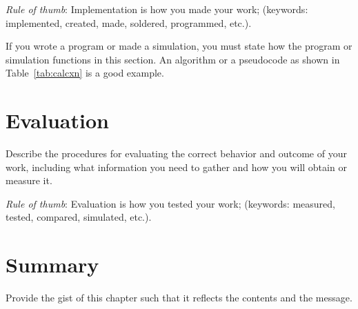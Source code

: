 \noindent \textit{Rule of thumb}: Implementation is how you made your  work; (keywords: implemented, created, made, soldered, programmed, etc.).

If you wrote a program or made a simulation, you must state how the program or simulation functions in this section.	An algorithm or a pseudocode as shown in Table~\ref{tab:calcxn} is a good example.


\graytx{\Blindtext}



\section{Evaluation}
\label{sec:evaluate}

Describe the procedures for evaluating the correct behavior and outcome of your  work, including what information you need to gather and how you will obtain or measure it.  

\textit{Rule of thumb}: Evaluation is how you tested your  work; (keywords: measured, tested, compared, simulated, etc.).

\graytx{\Blindtext}



\section{Summary}

Provide the gist of this chapter such that it reflects the contents and the message.
